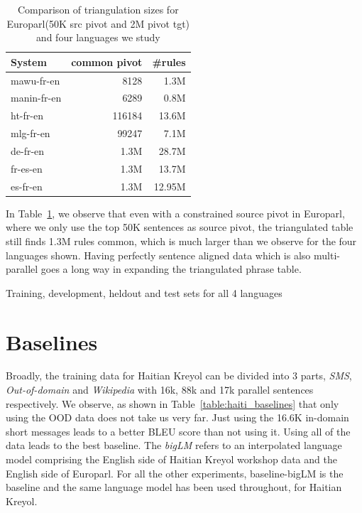 \begin{table}
	\small
	\centering
	\begin{tabular}{lrr}
	\toprule
	System & common pivot & \#rules \\
	\toprule
	mawu-fr-en & 8128 & 1.3M \\
	manin-fr-en & 6289 & 0.8M \\
	ht-fr-en & 116184 & 13.6M \\
	mlg-fr-en & 99247 & 7.1M \\
	\midrule
	de-fr-en & 1.3M & 28.7M \\
	fr-es-en & 1.3M & 13.7M \\
	es-fr-en & 1.3M & 12.95M \\
	\bottomrule
	\end{tabular}
	\caption{Comparison of triangulation sizes for Europarl(50K src pivot and 2M pivot tgt) and four languages we study}
	\label{table:triangulation_numbers}
\end{table}

	In Table~\ref{table:triangulation_numbers}, we observe that even with a constrained source pivot in Europarl, where we only use the top 50K sentences as source pivot, the triangulated table still finds 1.3M rules common, which is much larger than we observe for the four languages shown. Having perfectly sentence aligned data which is also multi-parallel goes a long way in expanding the triangulated phrase table. 

\begin{table}
         \small
         \centering
         
         \caption{Training, development, heldout and test sets for all 4 languages}
         \label{table:ddtt}
\end{table}



\section{Baselines}
\label{sec:baselines}
Broadly, the training data for Haitian Kreyol can be divided into 3 parts, \emph{SMS}, \emph{Out-of-domain} and \emph{Wikipedia} with 16k, 88k and 17k parallel sentences respectively. We observe, as shown in Table~\ref{table:haiti_baselines} that only using the OOD data does not take us very far. Just using the 16.6K in-domain short messages leads to a better BLEU score than not using it. Using all of the data leads to the best baseline. The \emph{bigLM} refers to an interpolated language model comprising the English side of Haitian Kreyol workshop data and the English side of Europarl. For all the other experiments, baseline-bigLM is the baseline and the same language model has been used throughout, for Haitian Kreyol. 

